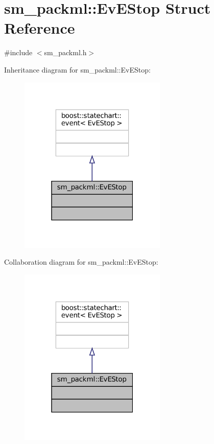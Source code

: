 \hypertarget{structsm__packml_1_1EvEStop}{}\section{sm\+\_\+packml\+:\+:Ev\+E\+Stop Struct Reference}
\label{structsm__packml_1_1EvEStop}


{\ttfamily \#include $<$sm\+\_\+packml.\+h$>$}



Inheritance diagram for sm\+\_\+packml\+:\+:Ev\+E\+Stop\+:
\nopagebreak
\begin{figure}[H]
\begin{center}
\leavevmode
\includegraphics[width=199pt]{structsm__packml_1_1EvEStop__inherit__graph}
\end{center}
\end{figure}


Collaboration diagram for sm\+\_\+packml\+:\+:Ev\+E\+Stop\+:
\nopagebreak
\begin{figure}[H]
\begin{center}
\leavevmode
\includegraphics[width=199pt]{structsm__packml_1_1EvEStop__coll__graph}
\end{center}
\end{figure}


